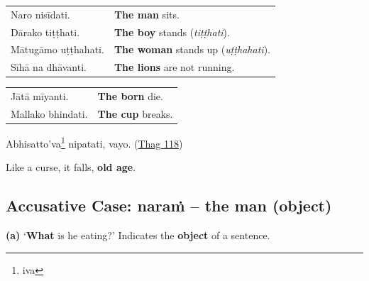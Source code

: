 \documentclass[11pt,oneside]{memoir}
\begin{document}
\begin{widecols}


\begin{center}
\begin{tabular}{ll}
Naro nisīdati. & \textbf{The man} sits.\\
Dārako tiṭṭhati. & \textbf{The boy} stands (\emph{tiṭṭhati}).\\
Mātugāmo uṭṭhahati. & \textbf{The woman} stands up (\emph{uṭṭhahati}).\\
Sīhā na dhāvanti. & \textbf{The lions} are not running.\\
\end{tabular}
\end{center}

\columnbreak

\begin{center}
\begin{tabular}{ll}
Jātā mīyanti. & \textbf{The born} die.\\
Mallako bhindati. & \textbf{The cup} breaks.\\
\end{tabular}
\end{center}

{\centering

Abhisatto'va\footnote{iva} nipatati, vayo. (\href{https://suttacentral.net/thag1.118/pli/ms}{Thag 118})

Like a curse, it falls, \textbf{old age}.

\mbox{}

\par}
\end{widecols}

\clearpage
\subsection{Accusative Case: naraṁ -- the man (object)}
\label{sec:orgc395465}

\textbf{(a)} `\textbf{What} is he eating?' Indicates the \textbf{object} of a sentence.

\renewcommand{\arraystretch}{1.8}
\end{document}
